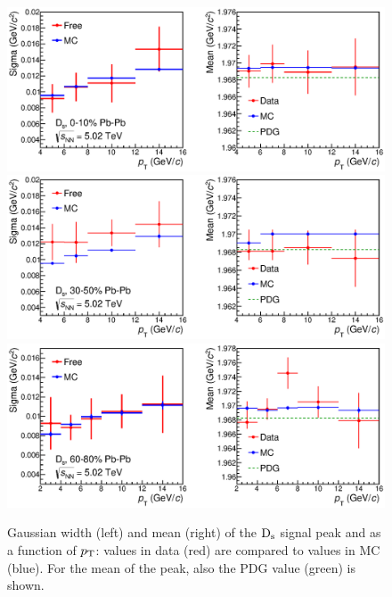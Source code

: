 \begin{figure}[!ht]
 \begin{center}
  \includegraphics[width=15cm]{./FigCap5/DsMeanSigma_DataMC_010.eps}
  \includegraphics[width=15cm]{./FigCap5/DsMeanSigma_DataMC_3050.eps}
  \includegraphics[width=15cm]{./FigCap5/DsMeanSigma_DataMC_6080.eps}
 \end{center}
 \caption{Gaussian width (left) and mean (right) of the ${\rm D_s}$ signal peak and as a function of $p_{\rm T}$: values in data (red) are compared to values in MC (blue). For the mean of the peak, also the PDG value (green) is shown. }
 \label{fig:MCsigmacheckDs} 
\end{figure} 



